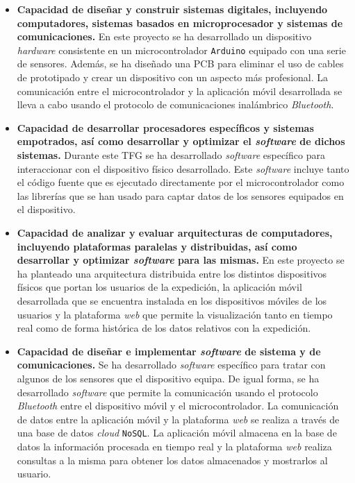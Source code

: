 \begin{itemize}
\item \textbf{Capacidad de diseñar y construir sistemas digitales, incluyendo computadores, sistemas basados en microprocesador y sistemas de comunicaciones.} En este proyecto se ha desarrollado un dispositivo \textit{hardware} consistente en un microcontrolador \texttt{Arduino} equipado con una serie de sensores. Además, se ha diseñado una \ac{PCB} para eliminar el uso de cables de prototipado y crear un dispositivo con un aspecto más profesional. La comunicación entre el microcontrolador y la aplicación móvil desarrollada se lleva a cabo usando el protocolo de comunicaciones inalámbrico \textit{Bluetooth}.

\item \textbf{Capacidad de desarrollar procesadores específicos y sistemas empotrados, así como desarrollar y optimizar el \textit{software} de dichos sistemas.} Durante este \ac{TFG} se ha desarrollado \textit{software} específico para interaccionar con el dispositivo físico desarrollado. Este \textit{software} incluye tanto el código fuente que es ejecutado directamente por el microcontrolador como las librerías que se han usado para captar datos de los sensores equipados en el dispositivo.

\item \textbf{Capacidad de analizar y evaluar arquitecturas de computadores, incluyendo plataformas paralelas y distribuidas, así como desarrollar y optimizar \textit{software} para las mismas.} En este proyecto se ha planteado una arquitectura distribuida entre los distintos dispositivos físicos que portan los usuarios de la expedición, la aplicación móvil desarrollada que se encuentra instalada en los dispositivos móviles de los usuarios y la plataforma \textit{web} que permite la visualización tanto en tiempo real como de forma histórica de los datos relativos con la expedición.

\item \textbf{Capacidad de diseñar e implementar \textit{software} de sistema y de comunicaciones.} Se ha desarrollado \textit{software} específico para tratar con algunos de los sensores que el dispositivo equipa. De igual forma, se ha desarrollado \textit{software} que permite la comunicación usando el protocolo \textit{Bluetooth} entre el dispositivo móvil y el microcontrolador. La comunicación de datos entre la aplicación móvil y la plataforma \textit{web} se realiza a través de una base de datos \textit{cloud} \texttt{NoSQL}. La aplicación móvil almacena en la base de datos la información procesada en tiempo real y la plataforma \textit{web} realiza consultas a la misma para obtener los datos almacenados y mostrarlos al usuario.


\end{itemize}
